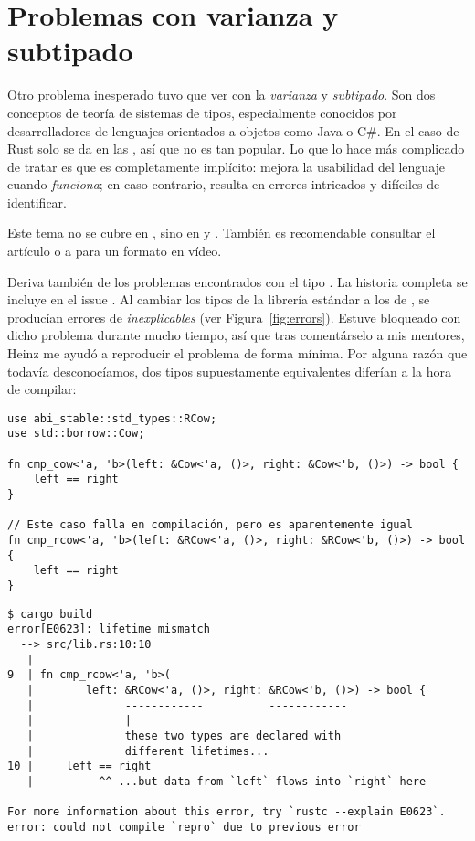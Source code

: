 \chapter{Problemas con varianza y subtipado}\label{annex:covariance}

Otro problema inesperado tuvo que ver con la \emph{varianza} y \emph{subtipado}.
Son dos conceptos de teoría de sistemas de tipos, especialmente conocidos por
desarrolladores de lenguajes orientados a objetos como Java o C\#. En el caso de
Rust solo se da en las \lifetimes, así que no es tan popular. Lo que lo hace más
complicado de tratar es que es completamente implícito: mejora la usabilidad del
lenguaje cuando \emph{funciona}; en caso contrario, resulta en errores
intricados y difíciles de identificar.

Este tema no se cubre en \textcite{rustbook}, sino en \textcite[Subtyping and
Variance]{nomicon} y \textcite[Subtyping and Variance]{rustref}. También es
recomendable consultar el artículo \textcite{lcnr_covandcontra} o a
\textcite{video_covandcontra} para un formato en vídeo.

Deriva también de los problemas encontrados con el tipo . La
historia completa se incluye en el issue \textcite{abi_covandcontra}. Al cambiar
los tipos de la librería estándar a los de \abistable, se producían errores de
\lifetimes \emph{inexplicables} (ver Figura~\ref{fig:errors}). Estuve bloqueado
con dicho problema durante mucho tiempo, así que tras comentárselo a mis
mentores, Heinz me ayudó a reproducir el problema de forma mínima. Por alguna
razón que todavía desconocíamos, dos tipos supuestamente equivalentes diferían a
la hora de compilar:

\begin{verbatim}
use abi_stable::std_types::RCow;
use std::borrow::Cow;

fn cmp_cow<'a, 'b>(left: &Cow<'a, ()>, right: &Cow<'b, ()>) -> bool {
    left == right
}

// Este caso falla en compilación, pero es aparentemente igual
fn cmp_rcow<'a, 'b>(left: &RCow<'a, ()>, right: &RCow<'b, ()>) -> bool {
    left == right
}
\end{verbatim}

\begin{verbatim}
$ cargo build
error[E0623]: lifetime mismatch
  --> src/lib.rs:10:10
   |
9  | fn cmp_rcow<'a, 'b>(
   |        left: &RCow<'a, ()>, right: &RCow<'b, ()>) -> bool {
   |              ------------          ------------
   |              |
   |              these two types are declared with
   |              different lifetimes...
10 |     left == right
   |          ^^ ...but data from `left` flows into `right` here

For more information about this error, try `rustc --explain E0623`.
error: could not compile `repro` due to previous error
\end{verbatim}

